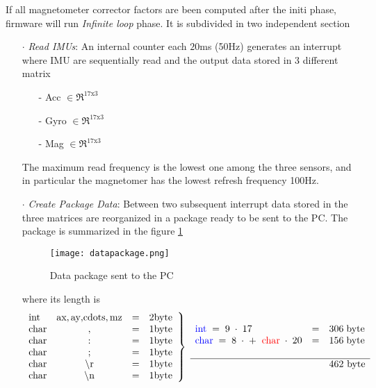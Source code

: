 If all magnetometer corrector factors are been computed after the initi phase, firmware will run \textit{Infinite loop} phase. It is subdivided in two independent section
\begin{enumerate}
\item[$\cdot$] \textit{Read IMUs}: An internal counter each $20$ms (50Hz) generates an interrupt where IMU are sequentially read and the output data stored in 3 different matrix
                          \begin{enumerate}
                          \item[-] Acc $\in \Re ^{17 \text{x} 3}$
                          \item[-] Gyro $\in \Re ^{17 \text{x} 3}$
                          \item[-] Mag $\in \Re ^{17 \text{x} 3}$
                          \end{enumerate}
                          The maximum read frequency is the lowest one among the three sensors, and in particular the magnetomer has the lowest refresh frequency 100Hz.
\item[$\cdot$] \textit{Create Package Data}:  Between two subsequent interrupt data stored in the three matrices are reorganized in a package ready to be sent to the PC. The package  is summarized in the figure \ref{fig:package}  
\begin{figure}[h]
\centering
\texttt{[image: datapackage.png]}
\caption{Data package sent to  the PC}
\label{fig:package}
\end{figure}  
 
\noindent where its length is 
\begin{equation*}
\displaystyle  \left. \begin{array}{lccc}
\text{int} & \text{ax},\text{ay}, $cdots$,\text{mz}  & = & 2 \text{byte} \\
\text{char} & , & = & 1 \text{byte} \\
\text{char} & : & = & 1 \text{byte} \\
\text{char} & ; & = & 1 \text{byte} \\
\text{char} & \backslash \text{r} & = & 1 \text{byte} \\
\text{char} & \backslash \text{n} & = & 1 \text{byte}
\end{array} \right\rbrace \; 
\begin{array}{lcl}
\textcolor{blue}{\text{int}} \; = \; 9 \; \cdot \; 17 \; & = & 306 \; \text{byte} \\
\textcolor{blue}{\text{char}} \; = \; 8  \; \cdot \;+\; \; \textcolor{red}{\text{char}} \; \cdot \; 20  & = & 156 \; \text{byte}  \\ 
& & \\ \hline 
 & & \text{462 byte}
\end{array} 
\end{equation*}


\end{enumerate}
